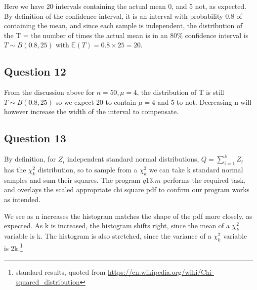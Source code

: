 \documentclass[10pt,a4paper]{report}
\begin{document}
Here we have 20 intervals containing the actual mean 0, and 5 not, as expected. By definition of the confidence interval, it is an interval with probability 0.8 of containing the mean, and since each sample is independent, the distribution of the T = the number of times the actual mean is in an 80\% confidence interval is $T\sim B(0.8,25)$ with $\mathbb{E}(T)=0.8\times 25=20$.

\subsection*{Question 12}

From the discussion above for $n=50,\mu=4$, the distribution of T is still $T\sim B(0.8,25)$ so we expect 20 to contain $\mu=4$ and 5 to not. Decreasing n will however increase the width of the interval to compensate.

\subsection*{Question 13}
By definition, for $Z_i$ independent standard normal distributions, $Q=\sum_{i=1}^k Z_i$ has the $\chi_k^2$ distribution, so to sample from a $\chi_k^2$ we can take k standard normal samples and sum their squares. The program $q13.m$ performs the required task, and overlays the scaled appropriate chi square pdf to confirm our program works as intended.\par
\vspace{5mm}

We see as n increases the histogram matches the shape of the pdf more closely, as expected. As k is increased, the histogram shifts right, since the mean of a $\chi_k^2$ variable is k. The histogram is also stretched, since the variance of a $\chi_k^2$ variable is 2k.\footnote{standard results, quoted from \url{https://en.wikipedia.org/wiki/Chi-squared_distribution}}
\end{document}
